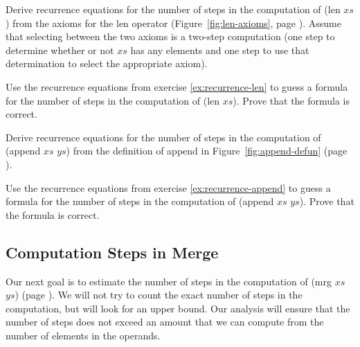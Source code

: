 \begin{ExerciseList}

\Exercise
\label{ex:recurrence-len}
Derive recurrence equations for the number of steps in the computation of \textsf{(len $xs$)}
from the axioms for the len operator (Figure~\ref{fig:len-axioms}, page \pageref{fig:len-axioms}).
Assume that selecting between the two axioms is a two-step computation
(one step to determine whether or not $xs$ has any elements
and one step to use that determination to select the appropriate axiom).

\Exercise
Use the recurrence equations from exercise \ref{ex:recurrence-len} to
guess a formula for the number of steps
in the computation of \textsf{(len $xs$)}.
Prove that the formula is correct.

\Exercise
\label{ex:recurrence-append}
Derive recurrence equations for the
number of steps in the computation of \textsf{(append $xs$ $ys$)}
from the definition of \textsf{append} in
Figure~\ref{fig:append-defun} (page \pageref{fig:append-defun}).

\Exercise
Use the recurrence equations from exercise \ref{ex:recurrence-append} to
guess a formula for the number of steps in the
computation of \textsf{(append $xs$ $ys$)}.
Prove that the formula is correct.

\end{ExerciseList}

\subsection{Computation Steps in Merge}
\label{subsec:mrg-steps}

Our next goal is to estimate the number of steps in
the computation of \textsf{(mrg $xs$ $ys$)} (page \pageref{defun:mrg}).
We will not try to count the exact number of steps in the computation,
but will look for an upper bound.
Our analysis
will ensure that the number of steps does not exceed an
amount that we can compute from the number of elements in the operands.

